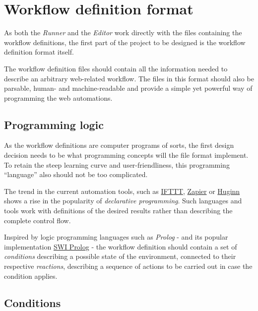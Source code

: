 \section{Workflow definition format}

As both the \textit{Runner} and the \textit{Editor} work directly with the files containing the workflow definitions, the first part of the project to be designed is the workflow definition format itself.

The workflow definition files should contain all the information needed to describe an arbitrary web-related workflow. 
The files in this format should also be parsable, human- and machine-readable and provide a simple yet powerful way of programming the web automations.

\subsection{Programming logic}

As the workflow definitions are computer programs of sorts, the first design decision needs to be what programming concepts will the file format implement.
To retain the steep learning curve and user-friendliness, this programming ``language'' also should not be too complicated.


The trend in the current automation tools, such as \href{https://ifttt.com/}{IFTTT}, \href{https://zapier.com/}{Zapier} 
or \href{https://github.com/huginn/huginn}{Huginn} shows a rise in the popularity of \textit{declarative programming}.
Such languages and tools work with definitions of the desired results rather than describing the complete control flow. 

Inspired by logic programming languages such as \textit{Prolog} - and its popular implementation \href{https://www.swi-prolog.org/}{SWI Prolog} - 
the workflow definition should contain a set of \textit{conditions} describing a possible state of the environment, connected to their respective \textit{reactions}, 
describing a sequence of actions to be carried out in case the condition applies.


\subsection{Conditions}
\label{conditions}

